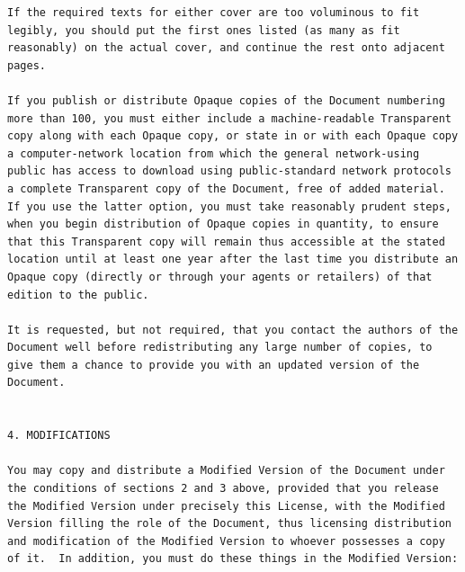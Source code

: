 \documentclass[a4paper]{report}
\begin{document}
\begin{verbatim}
If the required texts for either cover are too voluminous to fit
legibly, you should put the first ones listed (as many as fit
reasonably) on the actual cover, and continue the rest onto adjacent
pages.

If you publish or distribute Opaque copies of the Document numbering
more than 100, you must either include a machine-readable Transparent
copy along with each Opaque copy, or state in or with each Opaque copy
a computer-network location from which the general network-using
public has access to download using public-standard network protocols
a complete Transparent copy of the Document, free of added material.
If you use the latter option, you must take reasonably prudent steps,
when you begin distribution of Opaque copies in quantity, to ensure
that this Transparent copy will remain thus accessible at the stated
location until at least one year after the last time you distribute an
Opaque copy (directly or through your agents or retailers) of that
edition to the public.

It is requested, but not required, that you contact the authors of the
Document well before redistributing any large number of copies, to
give them a chance to provide you with an updated version of the
Document.


4. MODIFICATIONS

You may copy and distribute a Modified Version of the Document under
the conditions of sections 2 and 3 above, provided that you release
the Modified Version under precisely this License, with the Modified
Version filling the role of the Document, thus licensing distribution
and modification of the Modified Version to whoever possesses a copy
of it.  In addition, you must do these things in the Modified Version:


\end{verbatim}
\end{document}
